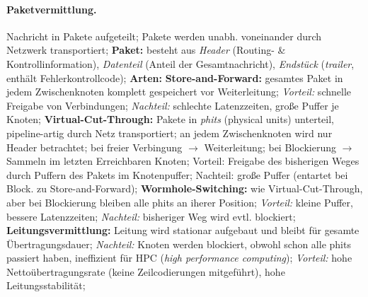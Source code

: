 \documentclass[8pt,a4paper]{article}
\begin{document}
\begin{multicols}{2}
\paragraph{Paketvermittlung.} Nachricht in Pakete aufgeteilt; Pakete
werden unabh. voneinander durch Netzwerk transportiert;
\textbf{Paket:} besteht aus \emph{Header} (Routing- \&
Kontrollinformation), \emph{Datenteil} (Anteil der Gesamtnachricht),
\emph{Endstück} (\emph{trailer}, enthält Fehlerkontrollcode);
\textbf{Arten:} \textbf{Store-and-Forward:} gesamtes Paket in jedem
Zwischenknoten komplett gespeichert vor Weiterleitung; \emph{Vorteil:}
schnelle Freigabe von Verbindungen; \emph{Nachteil:} schlechte Latenzzeiten,
große Puffer je Knoten; \textbf{Virtual-Cut-Through:} Pakete in
\emph{phits} (physical units) unterteil, pipeline-artig durch Netz
transportiert; an jedem Zwischenknoten wird nur Header betrachtet; bei
freier Verbingung $\rightarrow$ Weiterleitung; bei Blockierung
$\rightarrow$ Sammeln im letzten Erreichbaren Knoten; Vorteil:
Freigabe des bisherigen Weges durch Puffern des Pakets im
Knotenpuffer; Nachteil: große Puffer (entartet bei Block. zu
Store-and-Forward); \textbf{Wormhole-Switching:} wie
Virtual-Cut-Through, aber bei Blockierung bleiben alle phits an iherer
Position; \emph{Vorteil:} kleine Puffer, bessere Latenzzeiten;
\emph{Nachteil:} bisheriger Weg wird evtl. blockiert; \textbf{Leitungsvermittlung:}
Leitung wird stationar aufgebaut und bleibt für gesamte
Übertragungsdauer; \emph{Nachteil:} Knoten werden blockiert, obwohl schon
alle phits passiert haben, ineffizient für HPC (\emph{high performance
  computing}); \emph{Vorteil:} hohe Nettoübertragungsrate (keine
Zeilcodierungen mitgeführt), hohe Leitungsstabilität;


\end{multicols}
\end{document}
